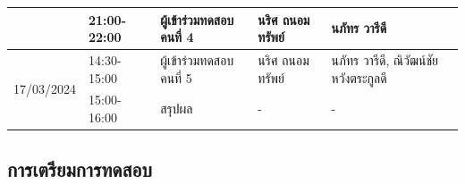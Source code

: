 \begin{enumerate}
\begin{table}[H]
\begin{tabular}{|r|l|l|l|l|}
                                                     & 21:00-22:00         & ผู้เข้าร่วมทดสอบ คนที่ 4 & นริศ ถนอมทรัพย์     & นภัทร วารีดี                   \\ \hline
                  \multirow[t]{2}{*}{17/03/2024}     & 14:30-15:00         & ผู้เข้าร่วมทดสอบ คนที่ 5 & นริศ ถนอมทรัพย์     & นภัทร วารีดี, ณิวัฒน์ชัย หวังตระกูลดี \\ \cline{2-5}
                                                     & 15:00-16:00         & สรุปผล              & -                & -                           \\ \hline
              \end{tabular}
          \end{table}
\end{enumerate}
\subsection{การเตรียมการทดสอบ}
